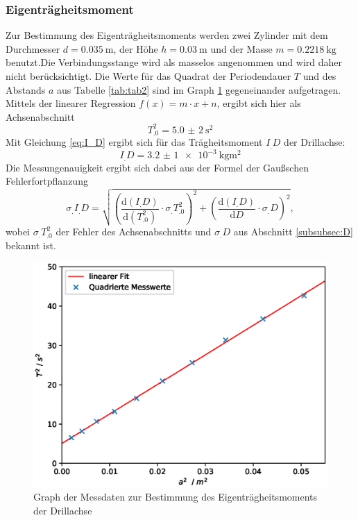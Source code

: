 \subsubsection{Eigenträgheitsmoment}\label{subsubsec:I_D}
Zur Bestimmung des Eigenträgheitsmoments werden zwei Zylinder mit dem Durchmesser $d = \SI{0,035}{\metre}$, der Höhe $h = \SI{0,03}{\metre}$ und der Masse $m = \SI{0,2218}{\kilogram}$ benutzt.\newline Die Verbindungsstange wird als masselos angenommen und wird daher nicht berücksichtigt.
Die Werte für das Quadrat der Periodendauer $T$ und des Abstands $a$ aus Tabelle \ref{tab:tab2} sind im Graph \ref{fig:abb2} gegeneinander aufgetragen. Mittels der linearer Regression $f(x) = m \cdot x + n$\cite{matplotlib}, ergibt sich hier als Achsenabschnitt \[T_.0^2=\SI{5,0(2)}{\second\squared}\]
Mit Gleichung \eqref{eq:I_D} ergibt sich für das Trägheitsmoment $I_.D$ der Drillachse:
\[I_.D=\SI{3,2(1)e-3}{\kilogram\metre\squared}\]
Die Messungenauigkeit ergibt sich dabei aus der Formel der Gaußschen Fehlerfortpflanzung
\[\sigma_.{I_.D}= \sqrt{(\frac{\mathrm{d}(I_.D)}{\mathrm{d}(T^2_.0)} \cdot \sigma_.{T^2_.0})^2+(\frac{\mathrm{d}(I_.D)}{\mathrm{d}D}\cdot\sigma_.D)^2},\]
wobei $\sigma_.{T^2_.0}$ der Fehler des Achsenabschnitts und $\sigma_.D$ aus Abschnitt \ref{subsubsec:D} bekannt ist.
\begin{figure}
\centering
\includegraphics[scale = .75,keepaspectratio]
	{content/images/plot1.eps}
\caption{Graph der Messdaten zur Bestimmung des Eigenträgheitsmoments der Drillachse}\label{fig:abb2}
\end{figure}

